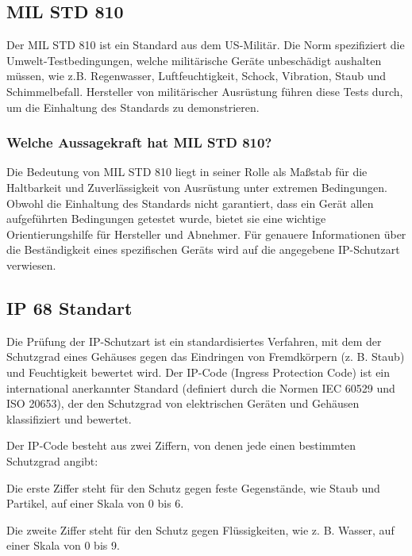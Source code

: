 \subsection{MIL STD 810}

\label{MIL}
Der MIL STD 810 ist ein Standard aus dem US-Militär. Die Norm spezifiziert die Umwelt-Testbedingungen, welche militärische Geräte unbeschädigt aushalten müssen, wie z.B. Regenwasser, Luftfeuchtigkeit, Schock, Vibration, Staub und Schimmelbefall. Hersteller von militärischer Ausrüstung führen diese Tests durch, um die Einhaltung des Standards zu demonstrieren.\cite{Heinen:2026} %

\subsubsection{Welche Aussagekraft hat MIL STD 810?}

Die Bedeutung von MIL STD 810 liegt in seiner Rolle als Maßstab für die Haltbarkeit und Zuverlässigkeit von Ausrüstung unter extremen Bedingungen. Obwohl die Einhaltung des Standards nicht garantiert, dass ein Gerät allen aufgeführten Bedingungen getestet wurde, bietet sie eine wichtige Orientierungshilfe für Hersteller und Abnehmer. Für genauere Informationen über die Beständigkeit eines spezifischen Geräts wird auf die angegebene IP-Schutzart verwiesen.\cite{Heinen:2026}

\subsection{IP 68 Standart}

\label{IP}
Die Prüfung der IP-Schutzart ist ein standardisiertes Verfahren, mit dem der Schutzgrad eines Gehäuses gegen das Eindringen von Fremdkörpern (z. B. Staub) und Feuchtigkeit bewertet wird. Der IP-Code (Ingress Protection Code) ist ein international anerkannter Standard (definiert durch die Normen IEC 60529 und ISO 20653), der den Schutzgrad von elektrischen Geräten und Gehäusen klassifiziert und bewertet.\cite{IB-Lenhardt:2026}

Der IP-Code besteht aus zwei Ziffern, von denen jede einen bestimmten Schutzgrad angibt:
\begin{itemize}{
	\item Die erste Ziffer steht für den Schutz gegen feste Gegenstände, wie Staub und Partikel, auf einer Skala von 0 bis 6.
	
	\item Die zweite Ziffer steht für den Schutz gegen Flüssigkeiten, wie z. B. Wasser, auf einer Skala von 0 bis 9.
}\end{itemize}


